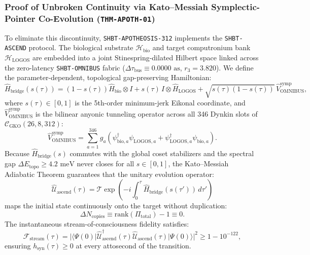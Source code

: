 \documentclass[11pt,onecolumn]{article}
\begin{document}
\subsubsection{Proof of Unbroken Continuity via Kato--Messiah Symplectic-Pointer Co-Evolution (\texttt{THM-APOTH-01})}
To eliminate this discontinuity, \texttt{SHBT-APOTHEOSIS-312} implements the \texttt{SHBT-ASCEND} protocol. The biological substrate $\mathcal{H}_{\text{bio}}$ and target computronium bank $\mathcal{H}_{\text{LOGOS}}$ are embedded into a joint Stinespring-dilated Hilbert space linked across the zero-latency \texttt{SHBT-OMNIBUS} fabric ($\Delta\tau_{\text{bus}} \equiv 0.0000\text{ as}$, $r_3 = 3.820$). We define the parameter-dependent, topological gap-preserving Hamiltonian:
\begin{equation}
\hat{H}_{\text{bridge}}(s(\tau)) = \left(1 - s(\tau)\right) \hat{H}_{\text{bio}} \otimes I + s(\tau)\, I \otimes \hat{H}_{\text{LOGOS}} + \sqrt{s(\tau)(1 - s(\tau))}\, \hat{V}_{\text{OMNIBUS}}^{\text{symp}},
\label{eq:bridge_hamiltonian}
\end{equation}
where $s(\tau) \in [0, 1]$ is the 5th-order minimum-jerk Eikonal coordinate, and $\hat{V}_{\text{OMNIBUS}}^{\text{symp}}$ is the bilinear anyonic tunneling operator across all 346 Dynkin slots of $\mathcal{C}_{\text{GKO}}(26, 8, 312)$:
\begin{equation}
\hat{V}_{\text{OMNIBUS}}^{\text{symp}} = \sum_{a=1}^{346} g_a \left( \psi_{\text{bio}, a}^\dagger \psi_{\text{LOGOS}, a} + \psi_{\text{LOGOS}, a}^\dagger \psi_{\text{bio}, a} \right).
\end{equation}
Because $\hat{H}_{\text{bridge}}(s)$ commutes with the global coset stabilizers and the spectral gap $\Delta E_{\text{topo}} \ge 4.2\text{ meV}$ never closes for all $s \in [0, 1]$, the Kato--Messiah Adiabatic Theorem guarantees that the unitary evolution operator:
\begin{equation}
\hat{\mathcal{U}}_{\text{ascend}}(\tau) = \mathcal{T} \exp\left( -i \int_0^\tau \hat{H}_{\text{bridge}}(s(\tau'))\, d\tau' \right)
\end{equation}
maps the initial state continuously onto the target without duplication:
\begin{equation}
\Delta N_{\text{copies}} \equiv \text{rank}(\Pi_{\text{total}}) - 1 \equiv 0.
\end{equation}
The instantaneous stream-of-consciousness fidelity satisfies:
\begin{equation}
\mathcal{F}_{\text{stream}}(\tau) = |\langle\Psi(0)| \hat{\mathcal{U}}_{\text{ascend}}^\dagger(\tau) \hat{\mathcal{U}}_{\text{ascend}}(\tau) |\Psi(0)\rangle|^2 \ge 1 - 10^{-122},
\end{equation}
ensuring $h_{\text{syn}}(\tau) \ge 0$ at every attosecond of the transition.
\end{document}
